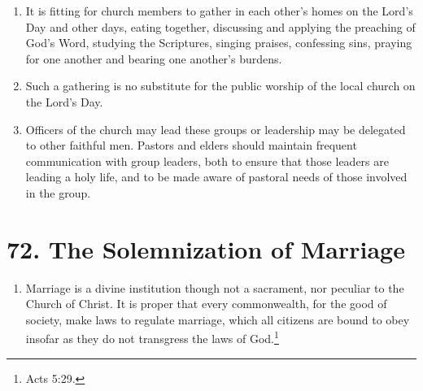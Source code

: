 \documentclass[
]{book}
\providecommand{\tightlist}{%
  \setlength{\itemsep}{0pt}\setlength{\parskip}{0pt}}
\begin{document}
\begin{enumerate}
\def\labelenumi{\arabic{enumi}.}
\tightlist
\item
  \protect\hypertarget{71}{\href{}{}}It is fitting for church members to gather in each other's homes on the Lord's Day and other days, eating together, discussing and applying the preaching of God's Word, studying the Scriptures, singing praises, confessing sins, praying for one another and bearing one another's burdens.
\item
  Such a gathering is no substitute for the public worship of the local church on the Lord's Day.
\item
  Officers of the church may lead these groups or leadership may be delegated to other faithful men. Pastors and elders should maintain frequent communication with group leaders, both to ensure that those leaders are leading a holy life, and to be made aware of pastoral needs of those involved in the group.
\end{enumerate}

\hypertarget{the-solemnization-of-marriage}{%
\section*{72. The Solemnization of Marriage}\label{the-solemnization-of-marriage}}

\protect\hypertarget{chapter-slug-72-the-solemnization-of-marriage}{\href{}{}}

\begin{enumerate}
\def\labelenumi{\arabic{enumi}.}
\tightlist
\item
  \protect\hypertarget{72}{\href{}{}}Marriage is a divine institution though not a sacrament, nor peculiar to the Church of Christ. It is proper that every commonwealth, for the good of society, make laws to regulate marriage, which all citizens are bound to obey insofar as they do not transgress the laws of God.\footnote{Acts 5:29.}
\end{enumerate}
\end{document}
